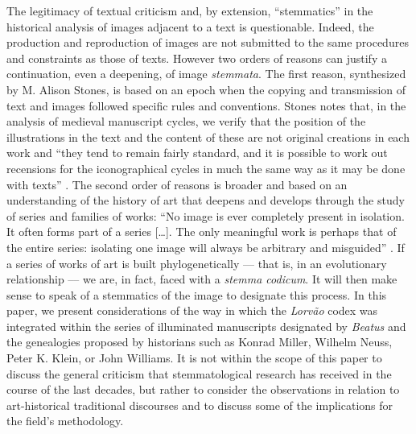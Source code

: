 \documentclass{article}
\begin{document}
The legitimacy of textual criticism and, by extension, ``stemmatics'' in
the historical analysis of images adjacent to a text is questionable.
Indeed, the production and reproduction of images are not submitted to
the same procedures and constraints as those of texts. However two
orders of reasons can justify a continuation, even a deepening, of image
\emph{stemmata}. The first reason, synthesized by M. Alison Stones, is
based on an epoch when the copying and transmission of text and images
followed specific rules and conventions. Stones notes that, in the
analysis of medieval manuscript cycles, we verify that the position of
the illustrations in the text and the content of these are not original
creations in each work and ``they tend to remain fairly standard, and it
is possible to work out recensions for the iconographical cycles in much
the same way as it may be done with texts'' \citep[96]{stones_secular_1976}. The
second order of reasons is broader and based on an understanding of the
history of art that deepens and develops through the study of series and
families of works: ``No image is ever completely present in isolation.
It often forms part of a series [\ldots]. The only meaningful work is
perhaps that of the entire series: isolating one image will always be
arbitrary and misguided'' \citep[31]{schmitt_images_2003}. If a series of works of
art is built phylogenetically ––  that is, in an evolutionary
relationship ––  we are, in fact, faced with a \emph{stemma codicum}. It
will then make sense to speak of a stemmatics of the image to designate
this process. In this paper, we present considerations of the way in
which the \emph{Lorvão} codex was integrated within the series of
illuminated manuscripts designated by \emph{Beatus} and the genealogies
proposed by historians such as Konrad Miller, Wilhelm Neuss, Peter K.
Klein, or John Williams. It is not within the scope of this paper to
discuss the general criticism that stemmatological research has received
in the course of the last decades, but rather to consider the
observations in relation to art-historical traditional discourses and to
discuss some of the implications for the field's methodology.
\end{document}
